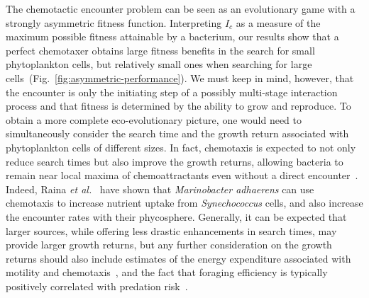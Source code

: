 \documentclass[9pt,twocolumn,twoside]{pnas-new}
\begin{document}
The chemotactic encounter problem can be seen as an evolutionary game with a strongly asymmetric fitness function.
Interpreting $I_c$ as a measure of the maximum possible fitness attainable by a bacterium, our results show that a perfect chemotaxer obtains large fitness benefits in the search for small phytoplankton cells, but relatively small ones when searching for large cells~(Fig.~\ref{fig:asymmetric-performance}). 
We must keep in mind, however, that the encounter is only the initiating step of a possibly multi-stage interaction process and that fitness is determined by the ability to grow and reproduce.
To obtain a more complete eco-evolutionary picture, one would need to simultaneously consider the search time and the growth return associated with phytoplankton cells of different sizes.
In fact, chemotaxis is expected to not only reduce search times but also improve the growth returns, allowing bacteria to remain near local maxima of chemoattractants even without a direct encounter~\cite{fernandez2019foraging}.
Indeed, Raina \textit{et al.}~\cite{raina2023chemotaxis} have shown that \textit{Marinobacter adhaerens} can use chemotaxis to increase nutrient uptake from \textit{Synechococcus} cells, and also increase the encounter rates with their phycosphere.
Generally, it can be expected that larger sources, while offering less drastic enhancements in search times, may provide larger growth returns, but any further consideration on the growth returns should also include estimates of the energy expenditure associated with motility and chemotaxis~\cite{malaguti2021theory,keegstra2022ecological}, and the fact that foraging efficiency is typically positively correlated with predation risk~\cite{nielsen2021foraging,ebrahimi2022particle}.
\end{document}
